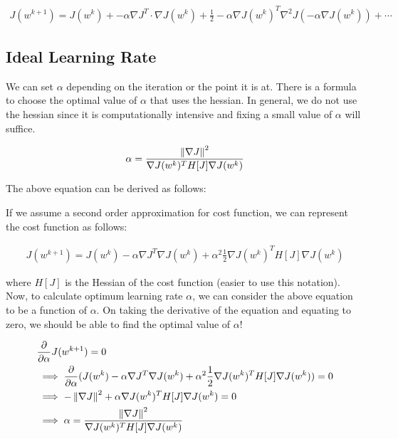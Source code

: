 \begin{equation}
\begin{split}
    J(w^{k+1}) = J(w^k) + -\alpha \nabla J^T\cdot \nabla J(w^k) + \frac{1}{2}-\alpha \nabla J(w^k)^T\nabla^2J(-\alpha \nabla J(w^k)) + \cdots
\end{split}
\label{jcost}
\end{equation}

\subsection{Ideal Learning Rate}

We can set $\alpha$ depending on the iteration or the point it is at. There is a formula to choose the optimal value of $\alpha$ that uses the hessian. In general, we do not use the hessian since it is computationally intensive and fixing a small value of $\alpha$ will suffice. 

\begin{equation}
    \alpha = \frac{\left\lVert\nabla J\right\rVert^2}{\nabla J(w^k)^TH[J]\nabla J(w^k)}
\end{equation}

The above equation can be derived as follows:

If we assume a second order approximation for cost function, we can represent the cost function as follows:

\begin{equation}
\begin{split}
    J(w^{k+1}) = J(w^k) - \alpha\nabla J^T\nabla J(w^k) + \alpha^2 \frac{1}{2} \nabla J(w^k)^TH[J]\nabla J(w^k)
\end{split}
\end{equation}

where $H[J]$ is the Hessian of the cost function (easier to use this notation). Now, to calculate optimum learning rate $\alpha$, we can consider the above equation to be a function of $\alpha$. On taking the derivative of the equation and equating to zero, we should be able to find the optimal value of $\alpha$!

\begin{equation*}
\begin{split}
    &\frac{\partial}{\partial \alpha}J(w^{k+1}) = 0 \\
    &\implies \frac{\partial}{\partial \alpha} (J(w^k) - \alpha\nabla J^T\nabla J(w^k) + \alpha^2 \frac{1}{2} \nabla J(w^k)^TH[J]\nabla J(w^k)) = 0 \\
    &\implies -\left\lVert\nabla J\right\rVert^2 + \alpha \nabla J(w^k)^TH[J]\nabla J(w^k) = 0 \\
    &\implies \alpha = \frac{\left\lVert\nabla J\right\rVert^2}{\nabla J(w^k)^TH[J]\nabla J(w^k)}
\end{split}
\end{equation*}


